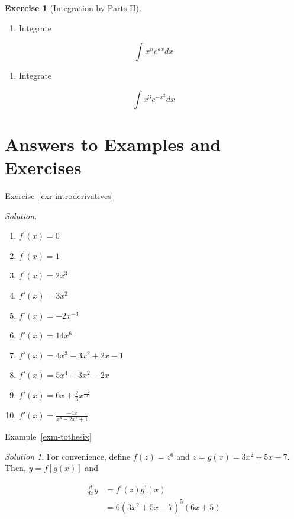 \documentclass[
  letterpaper,
]{book}
\providecommand{\tightlist}{%
  \setlength{\itemsep}{0pt}\setlength{\parskip}{0pt}}\usepackage{longtable,booktabs,array}
\theoremstyle{definition}
\theoremstyle{definition}
\theoremstyle{plain}
\theoremstyle{definition}
\newtheorem{exercise}{Exercise}[chapter]
\theoremstyle{plain}
\theoremstyle{plain}
\theoremstyle{remark}
\newtheorem*{solution}{Solution}
\begin{document}
\leavevmode{}%
\begin{exercise}[Integration by Parts II]\label{exr-intparts-adv}

\begin{enumerate}
\def\labelenumi{\arabic{enumi}.}
\tightlist
\item
  Integrate
\end{enumerate}

\[\int x^n e^{ax} dx\]

\begin{enumerate}
\def\labelenumi{\arabic{enumi}.}
\setcounter{enumi}{1}
\tightlist
\item
  Integrate
\end{enumerate}

\[\int x^3 e^{-x^2} dx\]

\end{exercise}

\hypertarget{answers-to-examples-and-exercises-2}{%
\section*{Answers to Examples and
Exercises}\label{answers-to-examples-and-exercises-2}}

Exercise~\ref{exr-introderivatives}

\emph{Solution.}

\begin{enumerate}
\def\labelenumi{\arabic{enumi}.}
\tightlist
\item
  \(f^\prime(x)= 0\)
\item
  \(f^\prime(x)= 1\)
\item
  \(f^\prime(x)= 2x^3\)
\item
  \(f\prime(x)= 3x^2\)
\item
  \(f\prime(x)= -2x^{-3}\)
\item
  \(f\prime(x)= 14x^6\)
\item
  \(f\prime(x) = 4x^3 - 3x^2 + 2x -1\)
\item
  \(f\prime(x) = 5x^4 + 3x^2 - 2x\)
\item
  \(f\prime(x) = 6x + \frac{2}{3}x^{\frac{-2}{3}}\)
\item
  \(f\prime(x)= \frac{-4x}{x^4 - 2x^2 + 1}\)
\end{enumerate}

Example~\ref{exm-tothesix}

\begin{solution}

For convenience, define \(f(z) = z^6\) and \(z = g(x) = 3x^2+5x-7\).
Then, \(y=f[g(x)]\) and

\begin{align*}
\frac{d}{dx}y&= f^\prime(z) g^\prime(x) \\
&= 6(3x^2+5x-7)^5 (6x + 5)
\end{align*}

\end{solution}
\end{document}
